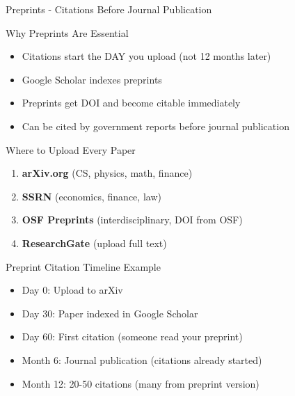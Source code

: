\documentclass[11pt]{beamer}
\begin{document}
	\begin{frame}{Preprints - Citations Before Journal Publication}
		\scriptsize
		\begin{block}{Why Preprints Are Essential}
			\begin{itemize}
				\item Citations start the DAY you upload (not 12 months later)
				\item Google Scholar indexes preprints
				\item Preprints get DOI and become citable immediately
				\item Can be cited by government reports before journal publication
			\end{itemize}
		\end{block}
		\begin{block}{Where to Upload Every Paper}
			\begin{enumerate}
				\item \textbf{arXiv.org} (CS, physics, math, finance)
				\item \textbf{SSRN} (economics, finance, law)
				\item \textbf{OSF Preprints} (interdisciplinary, DOI from OSF)
				\item \textbf{ResearchGate} (upload full text)
			\end{enumerate}
		\end{block}
		\begin{block}{Preprint Citation Timeline Example}
			\begin{itemize}
				\item Day 0: Upload to arXiv
				\item Day 30: Paper indexed in Google Scholar
				\item Day 60: First citation (someone read your preprint)
				\item Month 6: Journal publication (citations already started)
				\item Month 12: 20-50 citations (many from preprint version)
			\end{itemize}
		\end{block}
	\end{frame}
	
\end{document}
